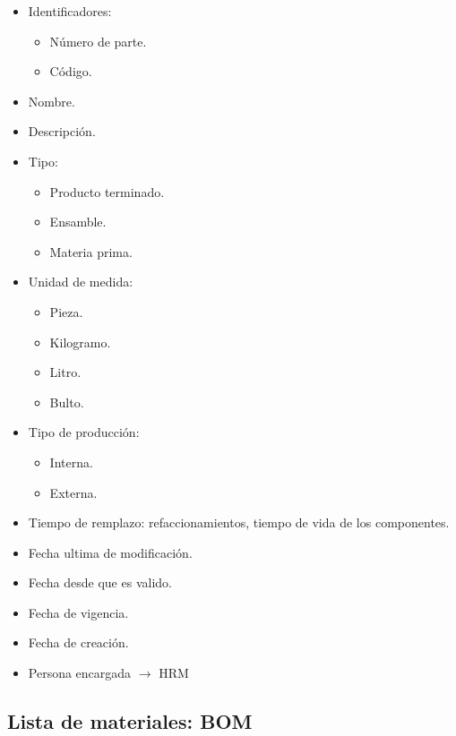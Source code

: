 \begin{enumerate}
    \begin{itemize}
        \item Identificadores:
            \begin{itemize}
                \item Número de parte.
                \item Código.
            \end{itemize}
        \item Nombre.
        \item Descripción. 
        \item Tipo:
            \begin{itemize}
                \item Producto terminado.
                \item Ensamble. 
                \item Materia prima.
            \end{itemize}
        \item Unidad de medida:
            \begin{itemize}
                \item Pieza. 
                \item Kilogramo.
                \item Litro.
                \item Bulto.
            \end{itemize}
        \item Tipo de producción:
            \begin{itemize}
                \item Interna.
                \item Externa.
            \end{itemize}
        \item Tiempo de remplazo: refaccionamientos, tiempo de vida de los componentes.
        \item Fecha ultima de modificación.
        \item Fecha desde que es valido.
        \item Fecha de vigencia.
        \item Fecha de creación. 
        \item Persona encargada \( \to \) HRM
    \end{itemize}
\end{enumerate}

\subsection{Lista de materiales: BOM}

